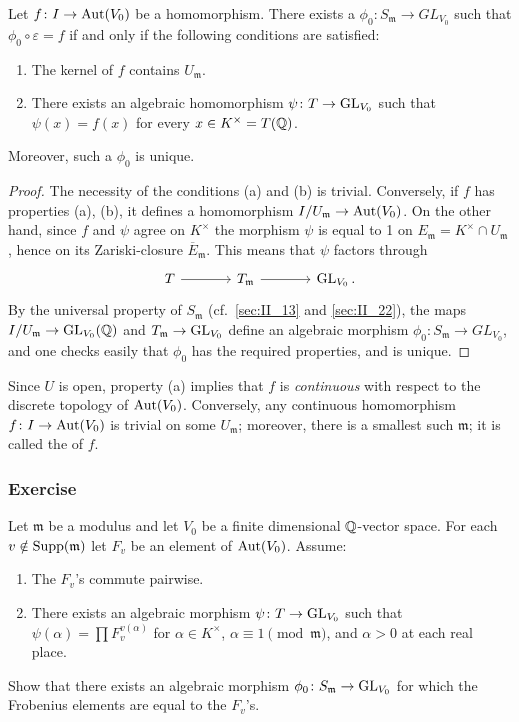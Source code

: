 \begin{prop}
Let $f \colon I \to \operatorname{Aut}(V_0)$ be a homomorphism. There exists a $\phi_0
\colon S_{\mathfrak{m}} \to GL_{V_0}$ such that $\phi_0 \circ \varepsilon =
f$ if and only if the following conditions are satisfied:
\begin{enumerate}
	\item The kernel of $f$ contains $U_{\mathfrak{m}}$.
	\item There exists an algebraic homomorphism $\psi\colon T \to
		\operatorname{GL}_{V_0}$ such that $\psi(x) = f(x)$ for every $x \in K^\times
		= T(\mathbb{Q})$.
\end{enumerate}
Moreover, such a $\phi_0$ is unique.
\end{prop}
\begin{proof}
The necessity of the conditions (a) and (b) is trivial. 
Conversely, if $f$ has properties (a), (b), it defines a homomorphism
$I/U_{\mathfrak{m}} \to \operatorname{Aut}(V_0)$. On the other hand, since $f$ and $\psi$ agree on $K^\times$
the morphism $\psi$ is equal to 1 on $E_{\mathfrak{m}} = K^\times \cap U_{\mathfrak{m}}$, hence on its
Zariski-closure $\overline{E}_{\mathfrak{m}}$. This means that $\psi$ factors through
\[\begin{tikzcd}[sep=large]
	T \rar & T_{\mathfrak{m}} \rar & \GL_{V_0}.
\end{tikzcd}\]
By the universal property of $S_{\mathfrak{m}}$ (cf.\ \ref{sec:II_13} and
\ref{sec:II_22}), the maps $I/U_{\mathfrak{m}} \to \operatorname{GL}_{V_0}(\mathbb{Q})$ and
$T_{\mathfrak{m}} \to \operatorname{GL}_{V_0}$ define an algebraic morphism $\phi_0 \colon
S_{\mathfrak{m}} \to GL_{V_0}$, and one checks easily that $\phi_0$ has the
required properties, and is unique.
\end{proof}

\begin{obs}
Since $U$ is open, property (a) implies that $f$ is \emph{continuous} with
\dpage
respect to the discrete topology of $\operatorname{Aut}(V_0)$. Conversely, any continuous
homomorphism $f\colon I \to \operatorname{Aut}(V_0)$ is trivial on some $U_{\mathfrak{m}}$;
moreover, there is a smallest such $\mathfrak{m}$; it is called the
 of $f$.
\end{obs}

\subsubsection*{Exercise}
Let $\mathfrak{m}$ be a modulus and let $V_0$ be a finite dimensional
$\mathbb{Q}$-vector space. For each $v \notin \operatorname{Supp}(\mathfrak{m})$ let $F_v$ be an
element of $\operatorname{Aut}(V_0)$. Assume:
\begin{enumerate}
	\item The $F_v$'s commute pairwise.
	\item There exists an algebraic morphism $\psi\colon T \to \operatorname{GL}_{V_0}$
		such that $\psi(\alpha) = \prod F_v^{v(\alpha)}$ for $\alpha
		\in K^\times$, $\alpha \equiv 1 \pmod{\mathfrak{m}}$, and
		$\alpha > 0$ at each real place.
\end{enumerate}
Show that there exists an algebraic morphism $\phi_0 \colon S_{\mathfrak{m}}
\to \operatorname{GL}_{V_0}$ for which the Frobenius elements are equal to the $F_v$'s.

